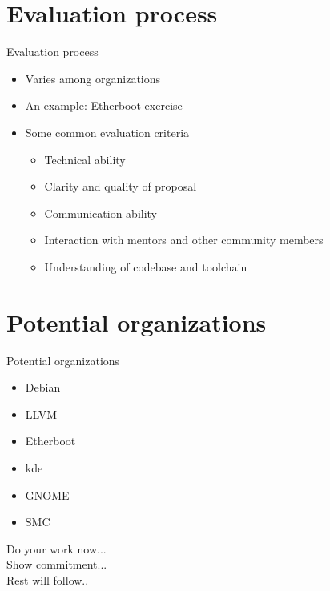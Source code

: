 \documentclass{beamer}
\begin{document}
\section{Evaluation process}
\begin{frame}{Evaluation process}
\begin{itemize}
\item Varies among organizations
\pause
\item An example: Etherboot exercise
\pause
\item Some common evaluation criteria
  \begin{itemize}
\pause
  \item Technical ability
\pause
  \item Clarity and quality of proposal
\pause
  \item Communication ability
\pause
  \item Interaction with mentors and other community members
\pause
  \item Understanding of codebase and toolchain
  \end{itemize}
\end{itemize}
\end{frame}

\section{Potential organizations}
\begin{frame}{Potential organizations}
\begin{itemize}
\item Debian
\item LLVM
\item Etherboot
\item kde
\item GNOME
\item SMC
\end{itemize}
\end{frame}

\begin{frame}{}
\begin{block}
{Do your work now...\\
Show commitment...\\
Rest will follow..}
\end{block}
\end{frame}
\end{document}
